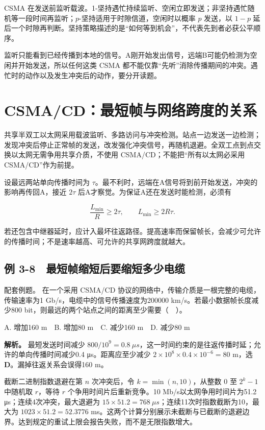 CSMA 在发送前监听载波。1-坚持遇忙持续监听、空闲立即发送；非坚持遇忙随机等一段时间再监听；\(p\)-坚持适用于时隙信道，空闲时以概率 \(p\) 发送，以 \(1-p\) 延后一个时隙再判断。坚持策略描述的是``如何等到机会''，不代表先到者必获公平顺序。

监听只能看到已经传播到本地的信号。A刚开始发出信号，远端B可能仍检测为空闲并开始发送，所以任何这类 CSMA 都不能仅靠``先听''消除传播期间的冲突。遇忙时的动作以及发生冲突后的动作，要分开读题。

\section{CSMA/CD：最短帧与网络跨度的关系}\label{CN03-11}

共享半双工以太网采用载波监听、多路访问与冲突检测。站点一边发送一边检测；发现冲突后停止正常帧的发送，改发强化冲突信号，再随机退避。全双工点到点交换以太网无需争用共享介质，不使用 CSMA/CD；不能把``所有以太网必采用 CSMA/CD''作为前提。

设最远两站单向传播时间为 \(\tau\)。最不利时，远端在A信号将到前开始发送，冲突的影响再传回A，接近 \(2\tau\) 后A才察觉。为保证A还在发送时能检测，必须有

\[\frac{L_{\min}}R\ge2\tau,\qquad L_{\min}\ge2R\tau.\]

若还包含中继器延时，应计入最坏往返路径。提高速率而保留帧长，会减少可允许的传播时间；不是速率越高、可允许的共享网跨度就越大。

\subsection{例 3-8　最短帧缩短后要缩短多少电缆}\label{CN03-ex8}

{\begin{example}[配套例题]

配套例题。 在一个采用 CSMA/CD 协议的网络中，传输介质是一根完整的电缆，传输速率为1 Gb/s，电缆中的信号传播速度为200000 km/s。若最小数据帧长度减少800 bit，则最远的两个站点之间的距离至少需要（　）。

A. 增加160 m　B. 增加80 m　C. 减少160 m　D. 减少80 m

\end{example}}

\textbf{解析。} 最短发送时间减少 \(800/10^9=0.8\ \mu s\)，这一时间约束的是往返传播时延；允许的单向传播时间减少0.4 μs。距离应至少减少 \(2\times10^8\times0.4\times10^{-6}=80\) m，选 \textbf{D}。漏掉往返关系会误得160 m。

截断二进制指数退避在第 \(n\) 次冲突后，令 \(k=\min(n,10)\)，从整数 \(0\) 至 \(2^k-1\) 中随机取 \(r\)，等待 \(r\) 个争用时间片后重新竞争。10 Mb/s以太网争用时间片为51.2 μs；连续4次冲突，最大退避为 \(15\times51.2=768\ \mu s\)；连续11次时指数截断为10，最大为 \(1023\times51.2=52.3776\) ms。这两个计算分别展示未截断与已截断的退避边界。达到规定的重试上限会报告失败，而不是无限指数增大。

